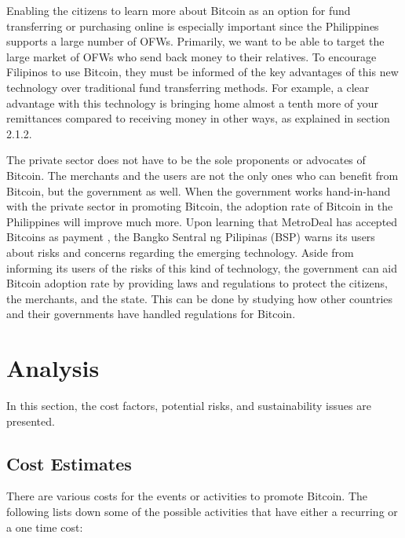 \documentclass{acm_proc_article-sp}
\begin{document}
Enabling the citizens to learn more about Bitcoin as an option for fund transferring or purchasing online is especially important since the Philippines supports a large number of OFWs.  Primarily, we want to be able to target the large market of OFWs who send back money to their relatives. To encourage Filipinos to use Bitcoin, they must be informed of the key advantages of this new technology over traditional fund transferring methods. For example, a clear advantage with this technology is bringing home almost a tenth more of your remittances compared to receiving money in other ways, as explained in section 2.1.2. 

The private sector does not have to be the sole proponents or advocates of Bitcoin. The merchants and the users are not the only ones who can benefit from Bitcoin, but the government as well. When the government works hand-in-hand with the private sector in promoting Bitcoin, the adoption rate of Bitcoin in the Philippines will improve much more. Upon learning that MetroDeal has accepted Bitcoins as payment \cite{Coins.ph:06292014}, the Bangko Sentral ng Pilipinas (BSP) warns its users about risks and concerns regarding the emerging technology. Aside from informing its users of the risks of this kind of technology, the government can aid Bitcoin adoption rate by providing laws and regulations to protect the citizens, the merchants, and the state. This can be done by studying how other countries and their governments have handled regulations for Bitcoin.

\section{Analysis}
In this section, the cost factors, potential risks, and sustainability issues are presented.

\subsection{Cost Estimates}
There are various costs for the events or activities to promote Bitcoin. The following lists down some of the possible activities that have either a recurring or a one time cost:
\end{document}
